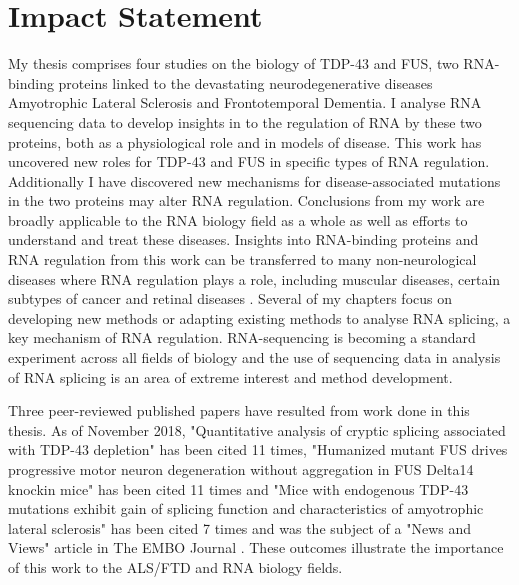 \cleardoublepage

\section*{Impact Statement}

My thesis comprises four studies on the biology of TDP-43 and FUS, two RNA-binding proteins linked to the devastating neurodegenerative diseases Amyotrophic Lateral Sclerosis and Frontotemporal Dementia.
I analyse RNA sequencing data to develop insights in to the regulation of RNA by these two proteins, both as a physiological role and in models of disease.
This work has uncovered new roles for TDP-43 and FUS in specific types of RNA regulation.
Additionally I have discovered new mechanisms for disease-associated mutations in the two proteins may alter RNA regulation.
Conclusions from my work are broadly applicable to the RNA biology field as a whole as well as efforts to understand and treat these diseases.
Insights into RNA-binding proteins and RNA regulation from this work can be transferred to many non-neurological diseases where RNA regulation plays a role, including muscular diseases, certain subtypes of cancer and retinal diseases \citep{Scotti2015}. 
Several of my chapters focus on developing new methods or adapting existing methods to analyse RNA splicing, a key mechanism of RNA regulation.
RNA-sequencing is becoming a standard experiment across all fields of biology and the use of sequencing data in analysis of RNA splicing is an area of extreme interest and method development. 

Three peer-reviewed published papers have resulted from work done in this thesis.
As of November 2018, "Quantitative analysis of cryptic splicing associated with TDP-43 depletion" \citep{Humphrey2017} has been cited 11 times, "Humanized mutant FUS drives progressive motor neuron degeneration without aggregation in FUS Delta14 knockin mice" \citep{Devoy2017} has been cited 11 times and "Mice with endogenous TDP-43 mutations exhibit gain of splicing function and characteristics of amyotrophic lateral sclerosis" \citep{Fratta2018} has been cited 7 times and was the subject of a "News and Views" article in The EMBO Journal \citep{Rouaux2018}.
These outcomes illustrate the importance of this work to the ALS/FTD and RNA biology fields.


